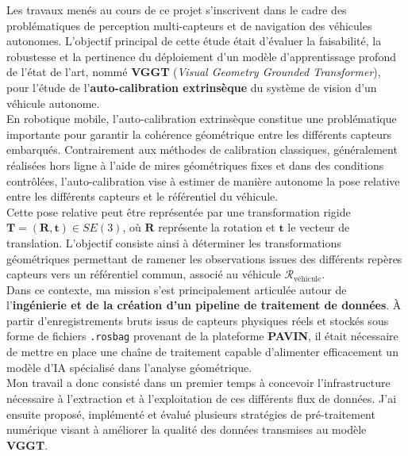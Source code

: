 \documentclass[12pt,a4paper,oneside]{report}
\begin{document}
\hspace*{0.3cm}Les travaux menés au cours de ce projet s'inscrivent dans le cadre des problématiques de perception multi-capteurs et de navigation des véhicules autonomes. L'objectif principal de cette étude était d'évaluer la faisabilité, la robustesse et la pertinence du déploiement d'un modèle d'apprentissage profond de l'état de l'art, nommé \textbf{VGGT} (\textit{Visual Geometry Grounded Transformer}), pour l'étude de l'\textbf{auto-calibration extrinsèque} du système de vision d'un véhicule autonome.\\
\hspace*{.3cm}En robotique mobile, l'auto-calibration extrinsèque constitue une problématique importante pour garantir la cohérence géométrique entre les différents capteurs embarqués. Contrairement aux méthodes de calibration classiques, généralement réalisées hors ligne à l'aide de mires géométriques fixes et dans des conditions contrôlées, l'auto-calibration vise à estimer de manière autonome la pose relative entre les différents capteurs et le référentiel du véhicule.\\

\hspace*{.3cm}Cette pose relative peut être représentée par une transformation rigide $\mathbf{T} = (\mathbf{R}, \mathbf{t}) \in SE(3)$, où $\mathbf{R}$ représente la rotation et $\mathbf{t}$ le vecteur de translation. L'objectif consiste ainsi à déterminer les transformations géométriques permettant de ramener les observations issues des différents repères capteurs vers un référentiel commun, associé au véhicule $\mathcal{R}_{\text{véhicule}}$.\\
\hspace*{.3cm}Dans ce contexte, ma mission s'est principalement articulée autour de l'\textbf{ingénierie et de la création d'un pipeline de traitement de données}. À partir d'enregistrements bruts issus de capteurs physiques réels et stockés sous forme de fichiers \texttt{.rosbag} provenant de la plateforme \textbf{PAVIN}, il était nécessaire de mettre en place une chaîne de traitement capable d'alimenter efficacement un modèle d'IA spécialisé dans l'analyse géométrique.\\

\hspace*{.3cm}Mon travail a donc consisté dans un premier temps à concevoir l'infrastructure nécessaire à l'extraction et à l'exploitation de ces différents flux de données. J'ai ensuite proposé, implémenté et évalué plusieurs stratégies de pré-traitement numérique visant à améliorer la qualité des données transmises au modèle \textbf{VGGT}.\\
\end{document}
